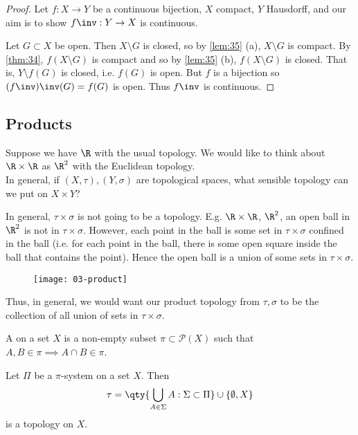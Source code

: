 \begin{proof}
    Let $f: X \to Y$ be a continuous bijection, $X$ compact, $Y$ Hausdorff, and our aim is to show $f\inv : Y \to X$ is continuous.

    Let $G\subset X$ be open. Then $X \setminus G$ is closed, so by \cref{lem:35} (a), $X \setminus G$ is compact.
    By \cref{thm:34}, $f(X \setminus G)$ is compact and so by \cref{lem:35} (b), $f(X \setminus G)$ is closed.
    That is, $Y \setminus f(G)$ is closed, i.e. $f(G)$ is open.
    But $f$ is a bijection so $(f\inv)\inv (G) = f(G)$ is open. Thus $f\inv$ is continuous.
\end{proof}

\subsection{Products}
Suppose we have $\R$ with the usual topology. We would like to think about $\R \times \R$ as $\R^2$ with the Euclidean topology. \\
In general, if $(X, \tau), (Y, \sigma)$ are topological spaces, what sensible topology can we put on $X \times Y$?

In general, $\tau \times \sigma$ is not going to be a topology. E.g. $\R\times \R$, $\R^2$, an open ball in $\R^2$ is not in $\tau\times \sigma$. However, each point in the ball is some set in $\tau\times \sigma$ confined in the ball (i.e. for each point in the ball, there is some open square inside the ball that contains the point). Hence the open ball is a union of some sets in $\tau \times \sigma$.

\begin{figure}[h]
    \centering
    \texttt{[image: 03-product]}
\end{figure}

Thus, in general, we would want our product topology from $\tau,\sigma$ to be the collection of all union of sets in $\tau \times\sigma$.

\begin{definition}[$\pi$-system]
A  on a set $X$ is a non-empty subset $\pi\subset \mathcal{P}(X)$ such that $A,B\in \pi \implies A\cap B\in \pi$.
\end{definition}

\begin{proposition} \label{prp:37}
Let $\Pi$ be a $\pi$-system on a set $X$. Then
\begin{align*}
    \tau = \qty{\bigcup_{A\in \Sigma} A : \Sigma \subset \Pi} \cup \set{\emptyset, X}
\end{align*} is a topology on $X$.
\end{proposition}


